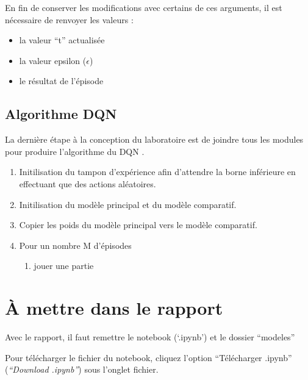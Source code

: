 \documentclass{article}
\begin{document}
\bigbreak
En fin de conserver les modifications avec certains de ces arguments, il est nécessaire de renvoyer les valeurs :
\begin{itemize}
  \item la valeur ``t'' actualisée
  \item la valeur epsilon ($\epsilon$)
  \item le résultat de l'épisode
\end{itemize}

\subsection{Algorithme DQN}
La dernière étape à la conception du laboratoire est de joindre tous les modules pour produire l'algorithme du DQN \citep{DQN-Article}.

\bigbreak
\begin{enumerate}
  \item Initilisation du tampon d'expérience afin d'attendre la borne inférieure en effectuant que des actions aléatoires.
  \item Initilisation du modèle principal et du modèle comparatif.
  \item Copier les poids du modèle principal vers le modèle comparatif.
  \item Pour un nombre M d'épisodes
  \begin{enumerate}
    \item jouer une partie
  \end{enumerate}
\end{enumerate}

\section{À mettre dans le rapport} %
Avec le rapport, il faut remettre le notebook (`.ipynb') et le dossier ``modeles''
\medbreak

Pour télécharger le fichier du notebook, cliquez l'option ``Télécharger .ipynb'' (\textit{``Download .ipynb''}) sous l'onglet fichier.
\end{document}
